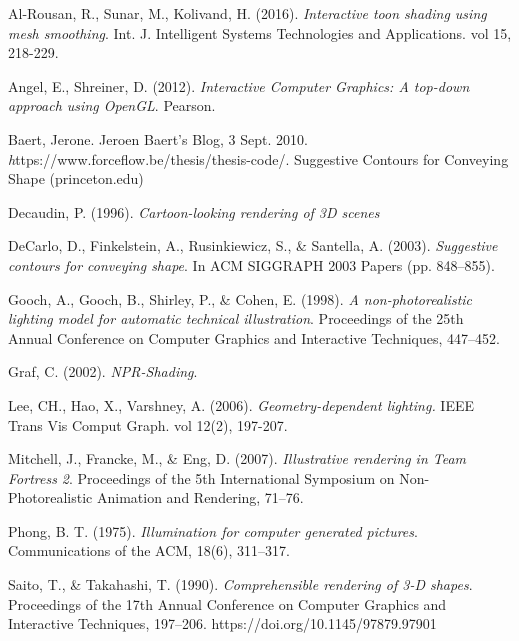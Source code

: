 \begin{thebibliography}{9}

Al-Rousan, R., Sunar, M., Kolivand, H. (2016).  \emph{Interactive toon shading using mesh smoothing}. Int. J. Intelligent Systems Technologies and Applications. vol 15, 218-229.    

Angel, E., Shreiner, D. (2012). \emph{Interactive Computer Graphics: A top-down approach using OpenGL}. Pearson.

Baert, Jerone. Jeroen Baert's Blog, 3 Sept. 2010. \emph https://www.forceflow.be/thesis/thesis-code/. Suggestive Contours for Conveying Shape (princeton.edu)

Decaudin, P. (1996). \emph{Cartoon-looking rendering of 3D scenes}

DeCarlo, D., Finkelstein, A., Rusinkiewicz, S., \& Santella, A. (2003). \emph{Suggestive contours for conveying shape}. In ACM SIGGRAPH 2003 Papers (pp. 848–855).

Gooch, A., Gooch, B., Shirley, P., \& Cohen, E. (1998). \emph{A non-photorealistic lighting model for automatic technical illustration}. Proceedings of the 25th Annual Conference on Computer Graphics and Interactive Techniques, 447–452.

Graf, C. (2002). \emph{NPR-Shading}.

Lee, CH., Hao, X., Varshney, A. (2006). \emph{Geometry-dependent lighting.} IEEE Trans Vis Comput Graph. vol 12(2), 197-207. 

Mitchell, J., Francke, M., \& Eng, D. (2007). \emph{Illustrative rendering in Team Fortress 2}. Proceedings of the 5th International Symposium on Non-Photorealistic Animation and Rendering, 71–76.

Phong, B. T. (1975). \emph{Illumination for computer generated pictures}. Communications of the ACM, 18(6), 311–317.

Saito, T., \& Takahashi, T. (1990). \emph{Comprehensible rendering of 3-D shapes}. Proceedings of the 17th Annual Conference on Computer Graphics and Interactive Techniques, 197–206. https://doi.org/10.1145/97879.97901
\end{thebibliography}
